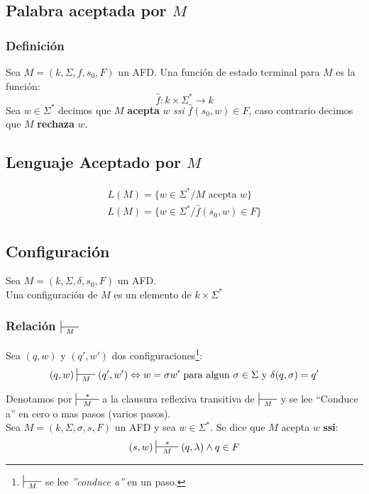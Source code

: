 \subsection{Palabra aceptada por $M$}
\subsubsection{Definición}
Sea $M=(k,\Sigma,f,s_0,F)$ un AFD. Una función de estado terminal para $M$ es la función:
$$
	\hat{f}: k \times \Sigma^* \rightarrow k
$$
Sea $w\in\Sigma^*$ decimos que $M$ \textbf{acepta} $w$ \textit{ssi} $\hat{f}(s_0,w)\in F$, caso contrario decimos que $M$ \textbf{rechaza} $w$.
\subsection{Lenguaje Aceptado por $M$}
\begin{align*}
L(M) = \{ w\in\Sigma^*  / M \text{ acepta } w\} \\
L(M) = \{ w\in\Sigma^* / \hat{f}(s_0,w)\in F \}
\end{align*}
\subsection{Configuración}
Sea $M=(k,\Sigma,\delta,s_0,F)$ un AFD. \\ $ { } $ \\ 
Una configuración de $M$ es un elemento de $k\times\Sigma^*$
\subsubsection{Relación $\sststile{M}{\hspace{0.25cm}  \hspace{0.25cm}}$}
Sea $(q,w)$ y $(q',w')$ dos configuraciones\footnote{$\sststile{M}{\hspace{0.25cm} \hspace{0.25cm}}$ se lee \textit{''conduce a''} en un paso.}:
$$
(q,w)\sststile{M}{\hspace{0.25cm} \hspace{0.25cm}} (q',w')\Leftrightarrow w = \sigma w' \text{ para algun } \sigma\in\Sigma \text{ y } \delta(q,\sigma)=q'
$$

Denotamos por $\sststile{M}{\hspace{0.25cm} * \hspace{0.25cm}}$ a la clausura reflexiva transitiva de $\sststile{M}{\hspace{0.25cm}  \hspace{0.25cm}}$ y se lee ``Conduce a'' en cero o mas pasos (varios pasos). \\${ }$\\
Sea $M=(k,\Sigma,\sigma,s,F)$ un AFD y sea $w\in\Sigma^*$. Se dice que $M$ acepta $w$ \textbf{ssi}:
$$
	(s,w) \sststile{M}{\hspace{0.25cm} * \hspace{0.25cm}} (q,\lambda) \wedge q\in F
$$
